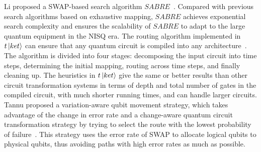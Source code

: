 \documentclass[runningheads]{llncs}
\begin{document}
Li proposed a SWAP-based search algorithm $SABRE$~\cite{Li2018}. Compared with previous search algorithms based on exhaustive mapping, $SABRE$ achieves exponential search complexity and ensures the scalability of $SABRE$ to adapt to the large quantum equipment in the NISQ era. The routing algorithm implemented in $t\left\vert{ket}\right\rangle$ can ensure that any quantum circuit is compiled into any architecture~\cite{Cowtan2019}. The algorithm is divided into four stages: decomposing the input circuit into time steps, determining the initial mapping, routing across time steps, and finally cleaning up. The heuristics in $t\left\vert{ket}\right\rangle$ give the same or better results than other circuit transformation systems in terms of depth and total number of gates in the compiled circuit, with much shorter running times, and can handle larger circuits. Tannu proposed a variation-aware qubit movement strategy, which takes advantage of the change in error rate and a change-aware quantum circuit transformation strategy by trying to select the route with the lowest probability of failure~\cite{Tannu2019}. This strategy uses the error rate of SWAP to allocate logical qubits to physical qubits, thus avoiding paths with high error rates as much as possible.
\end{document}
